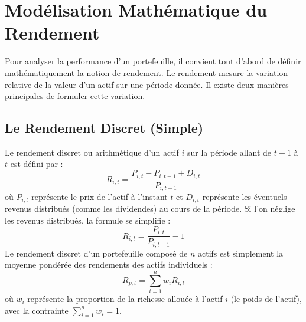 \section{Modélisation Mathématique du Rendement}
Pour analyser la performance d'un portefeuille, il convient tout d'abord de définir mathématiquement la notion de rendement. Le rendement mesure la variation relative de la valeur d'un actif sur une période donnée. Il existe deux manières principales de formuler cette variation.

\subsection{Le Rendement Discret (Simple)}
Le rendement discret ou arithmétique d'un actif $i$ sur la période allant de $t-1$ à $t$ est défini par :
\begin{equation}
    R_{i,t} = \frac{P_{i,t} - P_{i,t-1} + D_{i,t}}{P_{i,t-1}}
\end{equation}
où $P_{i,t}$ représente le prix de l'actif à l'instant $t$ et $D_{i,t}$ représente les éventuels revenus distribués (comme les dividendes) au cours de la période. Si l'on néglige les revenus distribués, la formule se simplifie :
\begin{equation}
    R_{i,t} = \frac{P_{i,t}}{P_{i,t-1}} - 1
\end{equation}
Le rendement discret d'un portefeuille composé de $n$ actifs est simplement la moyenne pondérée des rendements des actifs individuels :
\begin{equation}
    R_{p,t} = \sum_{i=1}^{n} w_i R_{i,t}
\end{equation}
où $w_i$ représente la proportion de la richesse allouée à l'actif $i$ (le poids de l'actif), avec la contrainte $\sum_{i=1}^{n} w_i = 1$.

